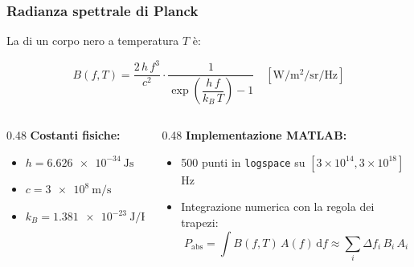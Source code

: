 \begin{frame}
\frametitle{Radianza spettrale di Planck}

La  di un corpo nero a temperatura $T$ \`e:

\[
  B(f, T) = \frac{2\,h\,f^3}{c^2}
             \cdot \frac{1}{\exp\!\left(\dfrac{h\,f}{k_B\,T}\right) - 1}
  \quad \left[\si{\watt\per\meter\squared\per\steradian\per\hertz}\right]
\]

\vspace{0.3em}
\begin{columns}[T]
  \begin{column}{0.48\textwidth}
    \textbf{Costanti fisiche:}
    \begin{itemize}
      \item $h = \SI{6.626e-34}{\joule\second}$
      \item $c = \SI{3e8}{\meter\per\second}$
      \item $k_B = \SI{1.381e-23}{\joule\per\kelvin}$
    \end{itemize}
  \end{column}
  \begin{column}{0.48\textwidth}
    \textbf{Implementazione MATLAB:}
    \begin{itemize}
      \item 500 punti in \texttt{logspace} su $[3\times10^{14}, 3\times10^{18}]$\,Hz
      \item Integrazione numerica con la regola dei trapezi:
        \[
          P_\text{abs} = \int B(f,T)\,A(f)\,\mathrm{d}f
                       \approx \sum_i \Delta f_i\,B_i\,A_i
        \]
    \end{itemize}
  \end{column}
\end{columns}

\end{frame}


